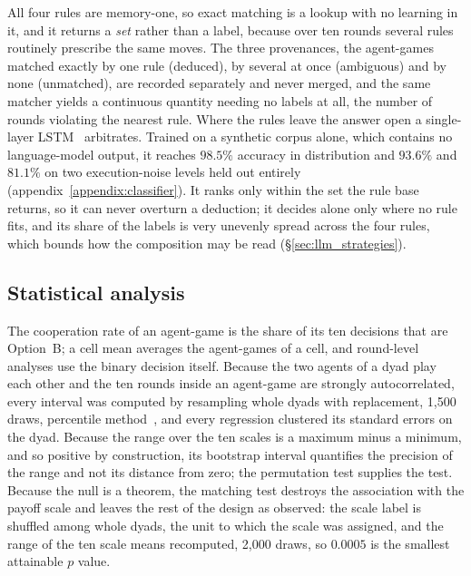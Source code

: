 \documentclass[openacc]{rsproca_new}
\begin{document}
All four rules are memory-one, so exact matching is a lookup with no learning
in it, and it returns a \emph{set} rather than a label, because over ten rounds
several rules routinely prescribe the same moves. The three provenances, the
agent-games matched exactly by one rule (deduced), by several at once
(ambiguous) and by none (unmatched), are recorded separately and never merged,
and the same matcher yields a continuous quantity needing no labels at all, the
number of rounds violating the nearest rule. Where the rules leave the answer
open a single-layer LSTM~\cite{lstm} arbitrates. Trained on a synthetic corpus
alone, which contains no language-model output, it reaches $98.5\%$ accuracy in
distribution and $93.6\%$ and $81.1\%$ on two execution-noise levels held out
entirely (appendix~\ref{appendix:classifier}). It ranks only within the set the
rule base returns, so it can never overturn a deduction; it decides alone only
where no rule fits, and its share of the labels is very unevenly spread across
the four rules, which bounds how the composition may be read
(\S\ref{sec:llm_strategies}).

\subsection{Statistical analysis}\label{sec:stats}

The cooperation rate of an agent-game is the share of its ten decisions that
are Option~B; a cell mean averages the agent-games of a cell, and round-level
analyses use the binary decision itself. Because the two agents of a dyad play
each other and the ten rounds inside an agent-game are strongly autocorrelated,
every interval was computed by resampling whole dyads with replacement, 1{,}500
draws, percentile method~\cite{efron1993introduction}, and every regression
clustered its standard errors on the dyad. Because the range over the ten
scales is a maximum minus a minimum, and so positive by construction, its
bootstrap interval quantifies the precision of the range and not its distance
from zero; the permutation test supplies the test. Because the null is a
theorem, the matching test destroys the association with the payoff scale and
leaves the rest of the design as observed: the scale label is shuffled among
whole dyads, the unit to which the scale was assigned, and the range of the ten
scale means recomputed, 2{,}000 draws, so $0.0005$ is the smallest attainable
$p$ value.
\end{document}
